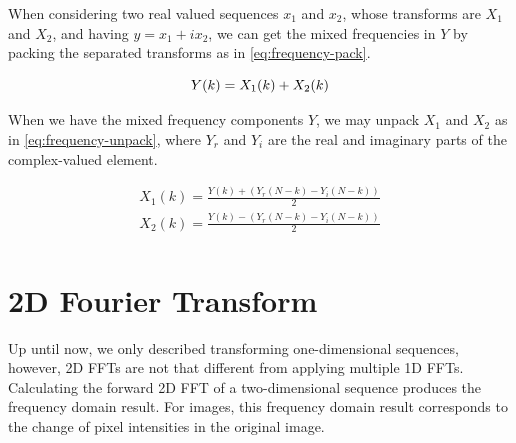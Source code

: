 \documentclass[
  oneside,
  11pt, a4paper,
  footinclude=true,
  headinclude=true,
  cleardoublepage=empty
]{scrbook}
\begin{document}
When considering two real valued sequences $x_{1}$ and $x_{2}$, whose transforms are $X_{1}$ and $X_{2}$, and having $y = x_{1} + ix_{2}$, we can get the mixed frequencies in $Y$ by packing the separated transforms as in \autoref{eq:frequency-pack}.

\begin{equation} \label{eq:frequency-pack}
        Y(k) = X_{1}(k) + X_{2}(k) \\ 
\end{equation}

When we have the mixed frequency components $Y$, we may unpack $X_{1}$ and $X_{2}$ as in \autoref{eq:frequency-unpack}, where $Y_{r}$ and $Y_{i}$ are the real and imaginary parts of the complex-valued element.

\begin{equation} \label{eq:frequency-unpack}
    \begin{split}
            X_{1}(k) = \frac{Y(k) + (Y_{r}(N-k) - Y_{i}(N-k))}{2} \\
            X_{2}(k) = \frac{Y(k) - (Y_{r}(N-k) - Y_{i}(N-k))}{2} \\
    \end{split}
\end{equation}




\section{2D Fourier Transform} \label{sec:2d-fourier-transform}

Up until now, we only described transforming one-dimensional sequences, however, 2D FFTs are not that different from applying multiple 1D FFTs. Calculating the forward 2D FFT of a two-dimensional sequence produces the frequency domain result. For images, this frequency domain result corresponds to the change of pixel intensities in the original image. %
\end{document}
